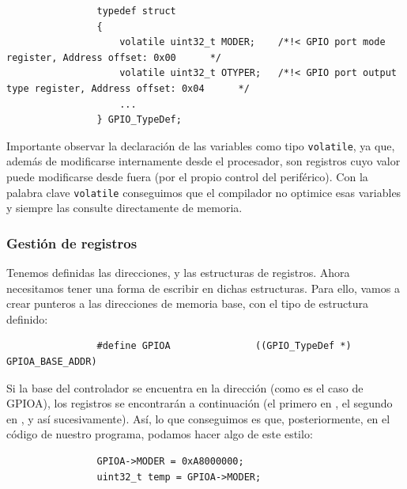 \documentclass[../main.tex]{subfiles}
\begin{document}
            \begin{lstlisting}
                typedef struct
                {
                    volatile uint32_t MODER;    /*!< GPIO port mode register, Address offset: 0x00      */
                    volatile uint32_t OTYPER;   /*!< GPIO port output type register, Address offset: 0x04      */
                    ...
                } GPIO_TypeDef;
            \end{lstlisting}
            
            Importante observar la declaración de las variables como tipo \lstinline|volatile|, ya que, además de modificarse internamente desde el procesador, son registros cuyo valor puede modificarse desde fuera (por el propio control del periférico). Con la palabra clave \lstinline|volatile| conseguimos que el compilador no optimice esas variables y siempre las consulte directamente de memoria.
            

        \subsubsection{Gestión de registros}

            Tenemos definidas las direcciones, y las estructuras de registros. Ahora necesitamos tener una forma de escribir en dichas estructuras. Para ello, vamos a crear punteros a las direcciones de memoria base, con el tipo de estructura definido:

            \begin{lstlisting}
                #define GPIOA               ((GPIO_TypeDef *) GPIOA_BASE_ADDR)
            \end{lstlisting}
            
            Si la base del controlador se encuentra en la dirección  (como es el caso de GPIOA), los registros se encontrarán a continuación (el primero  en , el segundo  en , y así sucesivamente). Así, lo que conseguimos es que, posteriormente, en el código de nuestro programa, podamos hacer algo de este estilo:

            \begin{lstlisting}
                GPIOA->MODER = 0xA8000000;
                uint32_t temp = GPIOA->MODER;
            \end{lstlisting}
\end{document}
